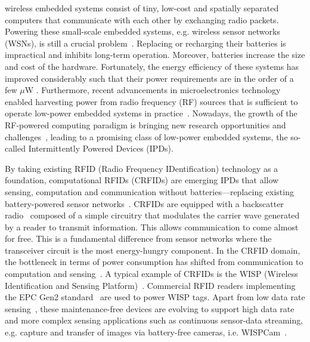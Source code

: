 \documentclass[10pt,journal,compsoc]{IEEEtran}
\begin{document}
\IEEEdisplaynontitleabstractindextext

\IEEEpeerreviewmaketitle




 wireless embedded systems consist of tiny, low-cost and spatially separated computers that communicate with each other by exchanging radio packets. Powering these small-scale embedded systems, e.g. wireless sensor networks (WSNs), is still a crucial problem~\cite{emergence}. Replacing or recharging their batteries is impractical and inhibits long-term operation. Moreover, batteries increase the size and cost of the hardware. Fortunately, the energy efficiency of these systems has improved considerably such that their power requirements are in the order of a few $\mu$W \cite{booksmith2013}. Furthermore, recent advancements in microelectronics technology enabled harvesting power from radio frequency (RF) sources that is sufficient to operate low-power embedded systems in practice~\cite{60ghz,emergence,bi:commag:2015,xie_wcom_2013,garnica_procieee_2013}. Nowadays, the growth of the RF-powered computing paradigm is bringing new research opportunities and challenges~\cite{emergence}, leading to a promising class of low-power embedded systems, the so-called Intermittently Powered Devices (IPDs).

By taking existing RFID (Radio Frequency IDentification) technology as a foundation, computational RFIDs (CRFIDs) are emerging IPDs that allow sensing, computation and communication without batteries---replacing existing battery-powered sensor networks~\cite{booksmith2013}. CRFIDs are equipped with a backscatter radio~\cite[Chapter 4]{rfid_handbook} composed of a simple circuitry that modulates the carrier wave generated by a reader to transmit information. This allows communication to come almost for free. This is a fundamental difference from sensor networks where the transceiver circuit is the most energy-hungry component. In the CRFID domain, the bottleneck in terms of power consumption has shifted from communication to computation and sensing~\cite{ekhonet}. A typical example of CRFIDs is the WISP (Wireless Identification and Sensing Platform)~\cite{wisp}. Commercial RFID readers implementing the EPC Gen2 standard~\cite{epc_gen2} are used to power WISP tags. Apart from low data rate sensing~\cite{neuralWISP}, these maintenance-free devices are evolving to support high data rate and more complex sensing applications such as continuous sensor-data streaming, e.g. capture and transfer of images via battery-free cameras, i.e. WISPCam~\cite{wispcam_2015,cameralocalize_2015}.
\end{document}
